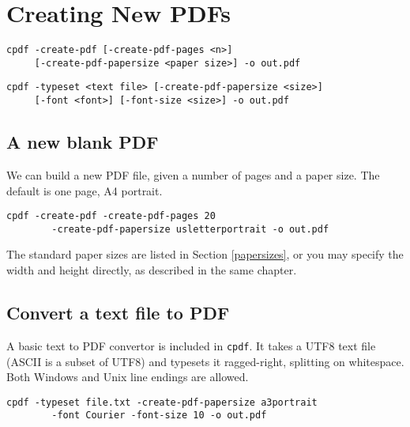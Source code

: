 \documentclass{book}
\begin{document}
\clearpage\pagestyle{empty}
\chapter{Creating New PDFs}\label{chap:17}\pagestyle{fancy}

  {\small\begin{framed}
  \noindent\verb!cpdf -create-pdf [-create-pdf-pages <n>]!\\
  \noindent\verb!     [-create-pdf-papersize <paper size>] -o out.pdf!

  \vspace{1.5mm}
  \noindent\verb!cpdf -typeset <text file> [-create-pdf-papersize <size>]!\\
  \noindent\verb!     [-font <font>] [-font-size <size>] -o out.pdf!

  \end{framed}}

\section{A new blank PDF}

We can build a new PDF file, given a number of pages and a paper size. The default is one page, A4 portrait.

\begin{framed}
 \small\verb?cpdf -create-pdf -create-pdf-pages 20?\\
 \noindent\small\verb?        -create-pdf-papersize usletterportrait -o out.pdf?
\end{framed}

\noindent The standard paper sizes are listed in Section \ref{papersizes}, or you may specify the width and height directly, as described in the same chapter.

\section{Convert a text file to PDF}
A basic text to PDF convertor is included in \texttt{cpdf}. It takes a UTF8 text file (ASCII is a subset of UTF8) and typesets it ragged-right, splitting on whitespace. Both Windows and Unix line endings are allowed. 

\begin{framed}
 \small\verb?cpdf -typeset file.txt -create-pdf-papersize a3portrait?\\
 \noindent\small\verb?        -font Courier -font-size 10 -o out.pdf?
\end{framed}
\end{document}
